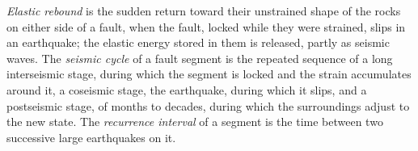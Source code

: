 \begin{definition}\label{def:b1:earthquake-source:seismic-cycle}
\emph{Elastic rebound} is the sudden return toward
their unstrained shape of the rocks on either side of a fault, when the fault,
locked while they were strained, slips in an earthquake; the elastic energy
stored in them is released, partly as seismic waves. The \emph{seismic
cycle} of a fault segment is the repeated sequence of a
long interseismic stage, during which the segment is locked and the strain
accumulates around it, a coseismic stage, the earthquake, during which it
slips, and a postseismic stage, of months to decades, during which the
surroundings adjust to the new state. The \emph{recurrence
interval} of a segment is the time between two
successive large earthquakes on it.
\end{definition}

